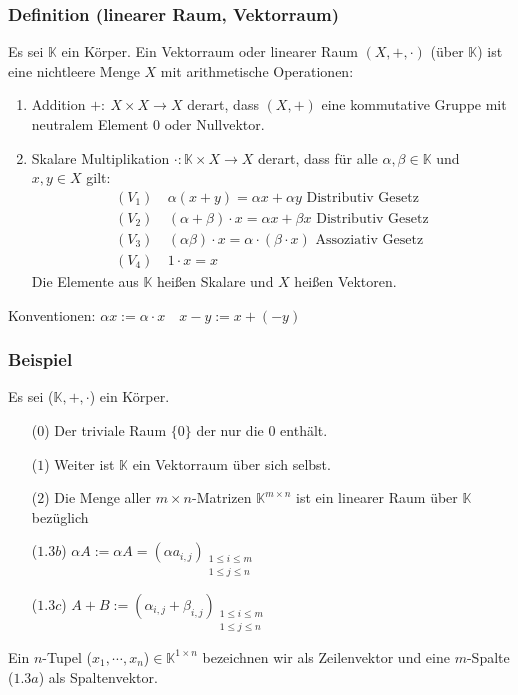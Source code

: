 \subsubsection{Definition (linearer Raum, Vektorraum)}
Es sei $\mathbb{K}$ ein Körper.  Ein Vektorraum oder linearer Raum $(X,+,\cdot )$ (über $\mathbb{K}$) ist eine nichtleere Menge $X$ mit arithmetische Operationen:
\begin{enumerate}
\item Addition $+:\ X\times X\rightarrow X$ derart, dass $(X,+)$ eine kommutative Gruppe mit neutralem Element $0$ oder Nullvektor.
\item Skalare Multiplikation $\cdot :\mathbb{K}\times X\rightarrow X$ derart, dass für alle $\alpha ,\beta \in \mathbb{K}$ und $x,y\in X$ gilt:
\begin{align*}
(V_1)&\ \alpha (x+y) = \alpha x+\alpha y \text{ Distributiv Gesetz}\\
(V_2)&\ (\alpha +\beta ) \cdot x = \alpha x + \beta x \text{ Distributiv Gesetz} \\
(V_3)&\ (\alpha\beta )\cdot x = \alpha \cdot (\beta \cdot x) \text{ Assoziativ Gesetz}\\
(V_4)&\ 1\cdot x = x
\end{align*}
Die Elemente aus $\mathbb{K}$ heißen Skalare und $X$ heißen Vektoren.
\end{enumerate}
Konventionen: $\alpha x := \alpha\cdot x \quad x-y:=x+(-y)$
\subsubsection{Beispiel}
Es sei ($\mathbb{K},+,\cdot $) ein Körper.
\begin{enumerate}
\item[($0$)] Der triviale Raum $\{0\}$ der nur die $0$ enthält.
\item[($1$)] Weiter ist $\mathbb{K}$ ein Vektorraum über sich selbst.
\item[($2$)] Die Menge aller $m\times n$-Matrizen $\mathbb{K}^{m\times n}$ ist ein linearer Raum über $\mathbb{K}$ bezüglich
\item[($1.3b$)] $\alpha A := \alpha A = (\alpha a_{i,j})_{\substack{1\leq i\leq m\\1\leq j\leq n}}$
\item[($1.3c$)] $A+B := (\alpha _{i,j}+\beta _{i,j})_{\substack{1\leq i\leq m\\1\leq j\leq n}}$
\end{enumerate}
Ein $n$-Tupel ($x_1,\cdots ,x_n$)$\in \mathbb{K}^{1\times n}$ bezeichnen wir als Zeilenvektor und eine $m$-Spalte ($1.3a$) als Spaltenvektor.
